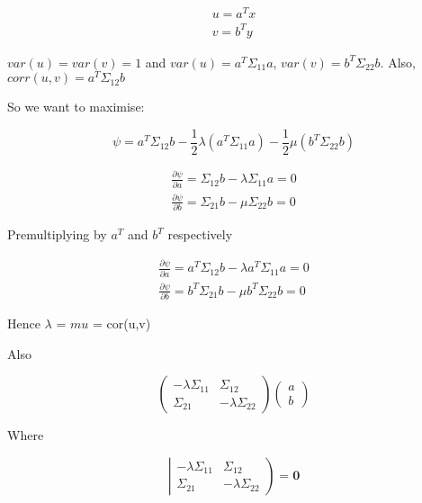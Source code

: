 \begin{eqnarray*}
u = a^{T}x\\
v = b^{T}y
\end{eqnarray*}

$var(u) = var(v) = 1$ and $var(u) = a^{T} \Sigma_{11} a$, $var(v) = b^{T} \Sigma_{22} b$.   Also, $corr(u,v) = a^{T} \Sigma_{12}b$


So we want to maximise:

\begin{displaymath}
\psi = a^{T} \Sigma_{12}b - \frac{1}{2} \lambda (a^{T} \Sigma_{11} a) - \frac{1}{2} \mu (b^{T} \Sigma_{22} b)
\end{displaymath}

\begin{eqnarray*}
\frac{\partial \psi}{\partial a} = \Sigma_{12} b - \lambda \Sigma_{11} a = 0\\
\frac{\partial \psi}{\partial b} = \Sigma_{21} b - \mu \Sigma_{22} b = 0
\end{eqnarray*}

Premultiplying by $a^{T}$ and $b^{T}$ respectively

\begin{eqnarray*}
\frac{\partial \psi}{\partial a} = a^{T} \Sigma_{12} b - \lambda a^{T} \Sigma_{11} a = 0\\
\frac{\partial \psi}{\partial b} = b^{T} \Sigma_{21} b - \mu b^{T} \Sigma_{22} b = 0
\end{eqnarray*}

Hence $\lambda$ = $mu$ = cor(u,v)


Also

\begin{displaymath}
\left( \begin{array}{rr} -\lambda \Sigma_{11} & \Sigma_{12} \\ \Sigma_{21} & -\lambda \Sigma_{22} \end{array} \right) \left( \begin{array}{r} a \\ b \end{array} \right)
\end{displaymath}

Where

\begin{displaymath}
\left| \begin{array}{rr} -\lambda \Sigma_{11} & \Sigma_{12} \\ \Sigma_{21} & -\lambda \Sigma_{22} \end{array} \right) = \boldsymbol{0}
\end{displaymath}



